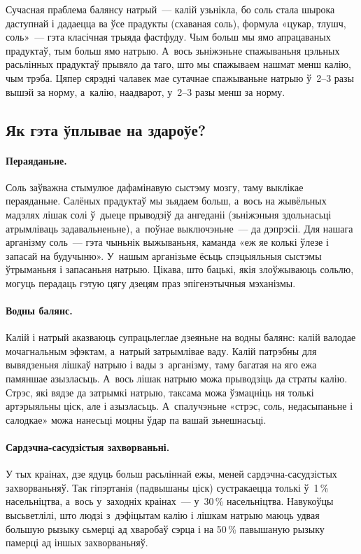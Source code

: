 Сучасная праблема балянсу натрый~--- калій узьнікла, бо соль стала шырока даступнай і дадаецца ва ўсе прадукты (схаваная соль), формула «цукар, тлушч, соль»~--- гэта класічная трыяда фастфуду. Чым больш мы ямо апрацаваных прадуктаў, тым больш ямо натрыю. А~вось зьніжэньне спажываньня цэльных расьлінных прадуктаў прывяло да таго, што мы спажываем нашмат менш калію, чым трэба. Цяпер сярэдні чалавек мае сутачнае спажываньне натрыю ў~2--3 разы вышэй за норму, а~калію, наадварот, у~2--3 разы менш за норму.

\subsection{Як гэта ўплывае на здароўе?}

\paragraph{Пераяданьне.}
Соль заўважна стымулюе дафамінавую сыстэму мозгу, таму выклікае пераяданьне. Салёных прадуктаў мы зьядаем больш, а~вось на жывёльных мадэлях лішак солі ў~дыеце прыводзіў да ангеданіі (зьніжэньня здольнасьці атрымліваць задавальненьне), а~поўнае выключэньне~--- да дэпрэсіі. Для нашага арганізму соль~--- гэта чыньнік выжываньня, каманда «еж яе колькі ўлезе і запасай на будучыню». У~нашым арганізьме ёсьць спэцыяльныя сыстэмы ўтрыманьня і запасаньня натрыю. Цікава, што бацькі, якія злоўжываюць сольлю, могуць перадаць гэтую цягу дзецям праз эпігенэтычныя мэханізмы.

\paragraph{Водны балянс.}
Калій і натрый аказваюць супрацьлеглае дзеяньне на водны балянс: калій валодае мочагнальным эфэктам, а~натрый затрымлівае ваду. Калій патрэбны для вывядзеньня лішкаў натрыю і вады з~арганізму, таму багатая на яго ежа памяншае азызласьць. А~вось лішак натрыю можа прыводзіць да страты калію. Стрэс, які вядзе да затрымкі натрыю, таксама можа ўзмацніць ня толькі артэрыяльны ціск, але і азызласьць. А~спалучэньне «стрэс, соль, недасыпаньне і салодкае» можа нанесьці моцны ўдар па вашай зьнешнасьці.

\paragraph{Сардэчна-сасудзістыя захворваньні.}
У тых краінах, дзе ядуць больш расьліннай ежы, меней сардэчна-сасудзістых захворваньняў. Так гіпэртанія (падвышаны ціск) сустракаецца толькі ў~1\,\% насельніцтва, а~вось у~заходніх краінах~--- у~30\,\% насельніцтва. Навукоўцы высьветлілі, што людзі з~дэфіцытам калію і лішкам натрыю маюць удвая большую рызыку сьмерці ад хваробаў сэрца і на 50\,\% павышаную рызыку памерці ад іншых захворваньняў.

